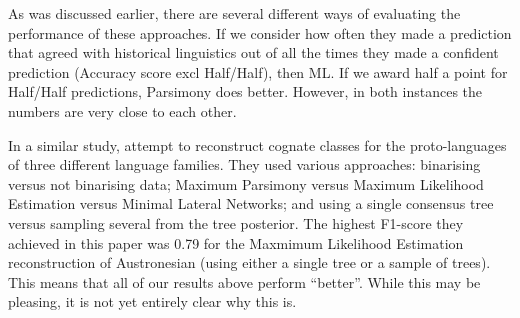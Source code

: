 \documentclass[a4paper,10pt]{article} %
\begin{document}
As was discussed earlier, there are several different ways of evaluating the performance of these approaches. If we consider how often they made a prediction that agreed with historical linguistics out of all the times they made a confident prediction (Accuracy score excl Half/Half), then ML. If we award half a point for Half/Half predictions, Parsimony does better. However, in both instances the numbers are very close to each other.



In a similar study, \citet{jager2018using} attempt to reconstruct cognate classes for the proto-languages of three different language families. They used various approaches: binarising versus not binarising data; Maximum Parsimony versus Maximum Likelihood Estimation versus Minimal Lateral Networks; and using a single consensus tree versus sampling several from the tree posterior. The highest F1-score they achieved in this paper was 0.79 for the Maxmimum Likelihood Estimation reconstruction of Austronesian (using either a single tree or a sample of trees). This means that all of our results above perform ``better''. While this may be pleasing, it is not yet entirely clear why this is. 
\end{document}
